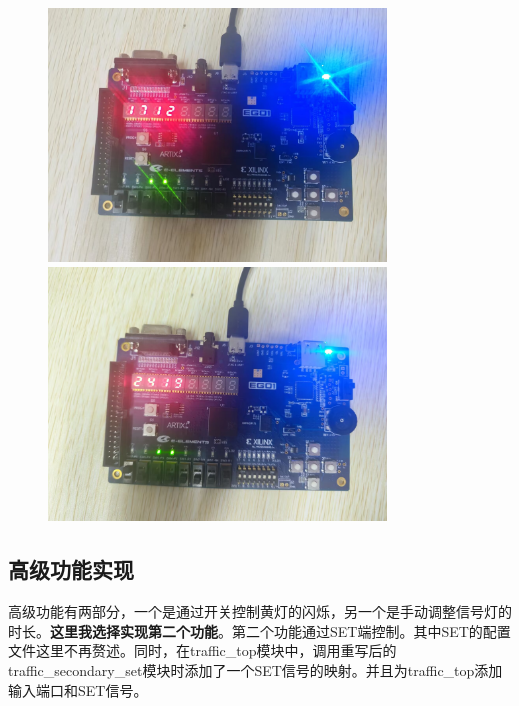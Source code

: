 \documentclass[a4,10pt,zihao=-4]{ctexart}
\begin{document}
\begin{figure}[!h]
	\centering
	\begin{minipage}{0.49\linewidth}
		\centering
		\includegraphics[width=0.8\textwidth]{program_device_pic_2.jpg}
	\end{minipage}
	\begin{minipage}{0.49\linewidth}
		\centering
		\includegraphics[width=0.8\textwidth]{program_device_pic_1.jpg}
	\end{minipage}
\end{figure}

\subsection{高级功能实现}
高级功能有两部分，一个是通过开关控制黄灯的闪烁，另一个是手动调整信号灯的时长。\textbf{这里我选择实现第二个功能}。第二个功能通过SET端控制。其中SET的配置文件这里不再赘述。同时，在traffic\_top模块中，调用重写后的traffic\_secondary\_set模块时添加了一个SET信号的映射。并且为traffic\_top添加输入端口和SET信号。
\end{document}
